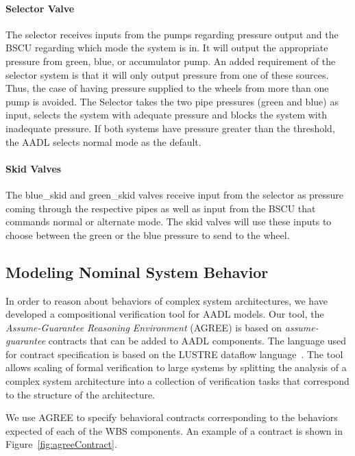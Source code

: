 \paragraph{Selector Valve}
The selector receives inputs from the pumps regarding pressure output and the BSCU regarding which mode the system is in. It will output the appropriate pressure from green, blue, or accumulator pump. An added requirement of the selector system is that it will only output pressure from one of these sources. Thus, the case of having pressure supplied to the wheels from more than one pump is avoided. The Selector takes the two pipe pressures (green and blue) as input, selects the system with adequate pressure and blocks the system with inadequate pressure. If both systems have pressure greater than the threshold, the AADL selects normal mode as the default.

\paragraph{Skid Valves}
The blue\_skid and green\_skid valves receive input from the selector as pressure coming through the respective pipes as well as input from the BSCU that commands normal or alternate mode. The skid valves will use these inputs to choose between the green or the blue pressure to send to the wheel.

\subsection{Modeling Nominal System Behavior}
In order to reason about behaviors of complex system architectures, we have developed a compositional verification tool for AADL models.  
Our tool, the {\em Assume-Guarantee Reasoning Environment} (AGREE) \cite{NFM2012:CoGaMiWhLaLu}  is based on {\em assume-guarantee} contracts that can be added to AADL components.  The language used for contract specification is based on the LUSTRE dataflow language~\cite{Halbwachs91:IEEE}. The tool allows scaling of formal verification to large systems by splitting the analysis of a complex system architecture into a collection of verification tasks that correspond to the structure of the architecture.

We use AGREE to specify behavioral contracts corresponding to the behaviors expected of each of the WBS components. An example of a contract is shown in Figure~\ref{fig:agreeContract}.
%

